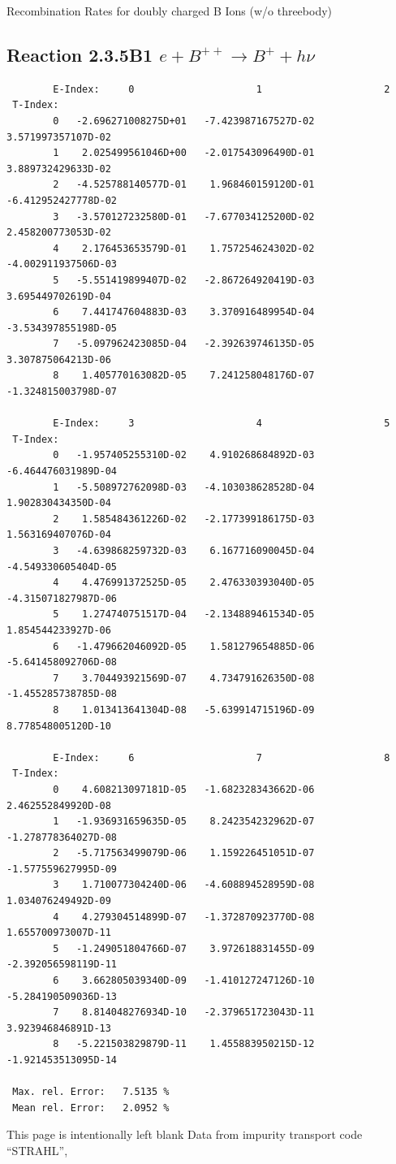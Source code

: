 \documentclass[12pt,dvips]{article}
\begin{document}
  Recombination Rates for doubly charged B Ions (w/o threebody)
\subsection{
Reaction 2.3.5B1  $e + B^{++} \rightarrow B^+ + h\nu$
}

\begin{small}\begin{verbatim}
        E-Index:     0                     1                     2
 T-Index:
        0   -2.696271008275D+01   -7.423987167527D-02    3.571997357107D-02
        1    2.025499561046D+00   -2.017543096490D-01    3.889732429633D-02
        2   -4.525788140577D-01    1.968460159120D-01   -6.412952427778D-02
        3   -3.570127232580D-01   -7.677034125200D-02    2.458200773053D-02
        4    2.176453653579D-01    1.757254624302D-02   -4.002911937506D-03
        5   -5.551419899407D-02   -2.867264920419D-03    3.695449702619D-04
        6    7.441747604883D-03    3.370916489954D-04   -3.534397855198D-05
        7   -5.097962423085D-04   -2.392639746135D-05    3.307875064213D-06
        8    1.405770163082D-05    7.241258048176D-07   -1.324815003798D-07

        E-Index:     3                     4                     5
 T-Index:
        0   -1.957405255310D-02    4.910268684892D-03   -6.464476031989D-04
        1   -5.508972762098D-03   -4.103038628528D-04    1.902830434350D-04
        2    1.585484361226D-02   -2.177399186175D-03    1.563169407076D-04
        3   -4.639868259732D-03    6.167716090045D-04   -4.549330605404D-05
        4    4.476991372525D-05    2.476330393040D-05   -4.315071827987D-06
        5    1.274740751517D-04   -2.134889461534D-05    1.854544233927D-06
        6   -1.479662046092D-05    1.581279654885D-06   -5.641458092706D-08
        7    3.704493921569D-07    4.734791626350D-08   -1.455285738785D-08
        8    1.013413641304D-08   -5.639914715196D-09    8.778548005120D-10

        E-Index:     6                     7                     8
 T-Index:
        0    4.608213097181D-05   -1.682328343662D-06    2.462552849920D-08
        1   -1.936931659635D-05    8.242354232962D-07   -1.278778364027D-08
        2   -5.717563499079D-06    1.159226451051D-07   -1.577559627995D-09
        3    1.710077304240D-06   -4.608894528959D-08    1.034076249492D-09
        4    4.279304514899D-07   -1.372870923770D-08    1.655700973007D-11
        5   -1.249051804766D-07    3.972618831455D-09   -2.392056598119D-11
        6    3.662805039340D-09   -1.410127247126D-10   -5.284190509036D-13
        7    8.814048276934D-10   -2.379651723043D-11    3.923946846891D-13
        8   -5.221503829879D-11    1.455883950215D-12   -1.921453513095D-14

 Max. rel. Error:   7.5135 %
 Mean rel. Error:   2.0952 %

\end{verbatim}\end{small}
\newpage
This page is intentionally left blank
\newpage
Data from impurity transport code ``STRAHL'', \cite{kn:Behringer}
\end{document}
